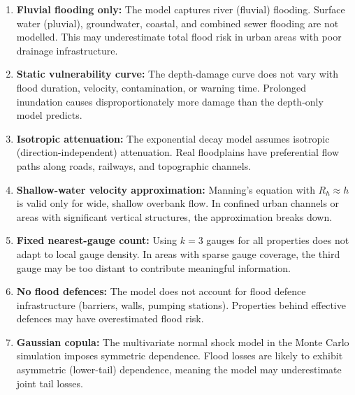 \documentclass[11pt,a4paper]{article}
\begin{document}
\mkmlimitations

\begin{enumerate}
    \item \textbf{Fluvial flooding only:} The model captures river (fluvial)
          flooding. Surface water (pluvial), groundwater, coastal, and combined sewer
          flooding are not modelled. This may underestimate total flood risk in urban
          areas with poor drainage infrastructure.

    \item \textbf{Static vulnerability curve:} The depth-damage curve does not vary
          with flood duration, velocity, contamination, or warning time. Prolonged
          inundation causes disproportionately more damage than the depth-only model
          predicts.

    \item \textbf{Isotropic attenuation:} The exponential decay model assumes
          isotropic (direction-independent) attenuation. Real floodplains have
          preferential flow paths along roads, railways, and topographic channels.

    \item \textbf{Shallow-water velocity approximation:} Manning's equation with
          $R_h \approx h$ is valid only for wide, shallow overbank flow. In confined
          urban channels or areas with significant vertical structures, the
          approximation breaks down.

    \item \textbf{Fixed nearest-gauge count:} Using $k = 3$ gauges for all
          properties does not adapt to local gauge density. In areas with sparse
          gauge coverage, the third gauge may be too distant to contribute meaningful
          information.

    \item \textbf{No flood defences:} The model does not account for flood defence
          infrastructure (barriers, walls, pumping stations). Properties behind
          effective defences may have overestimated flood risk.

    \item \textbf{Gaussian copula:} The multivariate normal shock model in the
          Monte Carlo simulation imposes symmetric dependence. Flood losses are
          likely to exhibit asymmetric (lower-tail) dependence, meaning the model
          may underestimate joint tail losses.


\end{enumerate}
\end{document}
